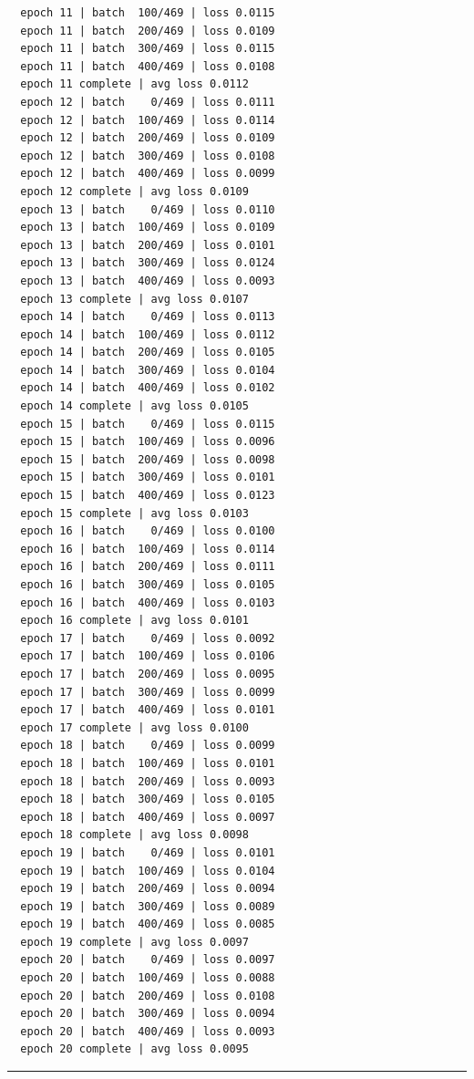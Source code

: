 \documentclass[
  letterpaper,
  DIV=11,
  numbers=noendperiod]{scrartcl}
\begin{document}
\begin{verbatim}
  epoch 11 | batch  100/469 | loss 0.0115
  epoch 11 | batch  200/469 | loss 0.0109
  epoch 11 | batch  300/469 | loss 0.0115
  epoch 11 | batch  400/469 | loss 0.0108
  epoch 11 complete | avg loss 0.0112
  epoch 12 | batch    0/469 | loss 0.0111
  epoch 12 | batch  100/469 | loss 0.0114
  epoch 12 | batch  200/469 | loss 0.0109
  epoch 12 | batch  300/469 | loss 0.0108
  epoch 12 | batch  400/469 | loss 0.0099
  epoch 12 complete | avg loss 0.0109
  epoch 13 | batch    0/469 | loss 0.0110
  epoch 13 | batch  100/469 | loss 0.0109
  epoch 13 | batch  200/469 | loss 0.0101
  epoch 13 | batch  300/469 | loss 0.0124
  epoch 13 | batch  400/469 | loss 0.0093
  epoch 13 complete | avg loss 0.0107
  epoch 14 | batch    0/469 | loss 0.0113
  epoch 14 | batch  100/469 | loss 0.0112
  epoch 14 | batch  200/469 | loss 0.0105
  epoch 14 | batch  300/469 | loss 0.0104
  epoch 14 | batch  400/469 | loss 0.0102
  epoch 14 complete | avg loss 0.0105
  epoch 15 | batch    0/469 | loss 0.0115
  epoch 15 | batch  100/469 | loss 0.0096
  epoch 15 | batch  200/469 | loss 0.0098
  epoch 15 | batch  300/469 | loss 0.0101
  epoch 15 | batch  400/469 | loss 0.0123
  epoch 15 complete | avg loss 0.0103
  epoch 16 | batch    0/469 | loss 0.0100
  epoch 16 | batch  100/469 | loss 0.0114
  epoch 16 | batch  200/469 | loss 0.0111
  epoch 16 | batch  300/469 | loss 0.0105
  epoch 16 | batch  400/469 | loss 0.0103
  epoch 16 complete | avg loss 0.0101
  epoch 17 | batch    0/469 | loss 0.0092
  epoch 17 | batch  100/469 | loss 0.0106
  epoch 17 | batch  200/469 | loss 0.0095
  epoch 17 | batch  300/469 | loss 0.0099
  epoch 17 | batch  400/469 | loss 0.0101
  epoch 17 complete | avg loss 0.0100
  epoch 18 | batch    0/469 | loss 0.0099
  epoch 18 | batch  100/469 | loss 0.0101
  epoch 18 | batch  200/469 | loss 0.0093
  epoch 18 | batch  300/469 | loss 0.0105
  epoch 18 | batch  400/469 | loss 0.0097
  epoch 18 complete | avg loss 0.0098
  epoch 19 | batch    0/469 | loss 0.0101
  epoch 19 | batch  100/469 | loss 0.0104
  epoch 19 | batch  200/469 | loss 0.0094
  epoch 19 | batch  300/469 | loss 0.0089
  epoch 19 | batch  400/469 | loss 0.0085
  epoch 19 complete | avg loss 0.0097
  epoch 20 | batch    0/469 | loss 0.0097
  epoch 20 | batch  100/469 | loss 0.0088
  epoch 20 | batch  200/469 | loss 0.0108
  epoch 20 | batch  300/469 | loss 0.0094
  epoch 20 | batch  400/469 | loss 0.0093
  epoch 20 complete | avg loss 0.0095
\end{verbatim}

\begin{center}\rule{0.5\linewidth}{0.5pt}\end{center}
\end{document}
